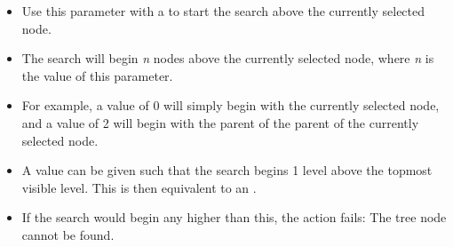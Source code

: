 \begin{itemize}
\item Use this parameter with a  to start the search above the currently selected node.
\item The search will begin \emph{n} nodes above the currently selected node, where \emph{n} is the value of this parameter.
\item For example, a value of 0 will simply begin with the currently selected node, and a value of 2 will begin with the parent of the parent of the currently selected node.
\item A value can be given such that the search begins 1 level above the topmost visible level. This is then equivalent to an .
\item If the search would begin any higher than this, the action fails: The tree node cannot be found.
\end{itemize}

\normalsize \latex{ \end{adjustwidth} }
\latex{\begin{adjustwidth}{.5cm}{.5cm}}%
\footnotesize%
